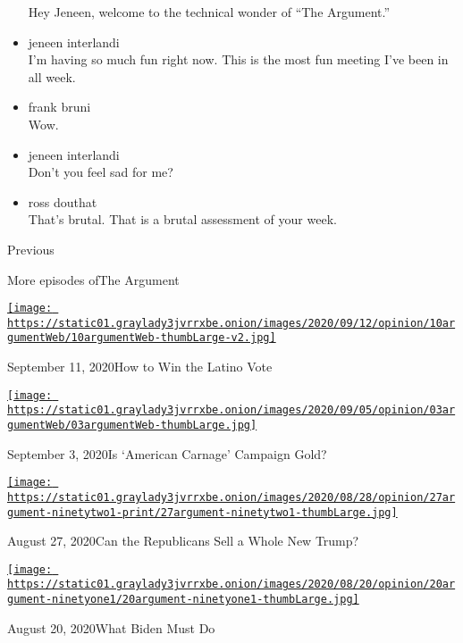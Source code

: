 \begin{itemize}
  Hey Jeneen, welcome to the technical wonder of ``The Argument.''
\item
  jeneen interlandi\\
  I'm having so much fun right now. This is the most fun meeting I've
  been in all week.
\item
  frank bruni\\
  Wow.
\item
  jeneen interlandi\\
  Don't you feel sad for me?
\item
  ross douthat\\
  That's brutal. That is a brutal assessment of your week.
\end{itemize}

Previous

More episodes ofThe Argument

\href{https://www.nytimes3xbfgragh.onion/2020/09/11/opinion/the-argument-latino-2020-vote.html?action=click\&module=audio-series-bar\&region=header\&pgtype=Article}{\texttt{[image: https://static01.graylady3jvrrxbe.onion/images/2020/09/12/opinion/10argumentWeb/10argumentWeb-thumbLarge-v2.jpg]}}

September 11, 2020How to Win the Latino Vote

\href{https://www.nytimes3xbfgragh.onion/2020/09/03/opinion/the-argument-trump-biden-kenosha-portland.html?action=click\&module=audio-series-bar\&region=header\&pgtype=Article}{\texttt{[image: https://static01.graylady3jvrrxbe.onion/images/2020/09/05/opinion/03argumentWeb/03argumentWeb-thumbLarge.jpg]}}

September 3, 2020Is `American Carnage' Campaign Gold?

\href{https://www.nytimes3xbfgragh.onion/2020/08/27/opinion/the-argument-republican-convention-trump.html?action=click\&module=audio-series-bar\&region=header\&pgtype=Article}{\texttt{[image: https://static01.graylady3jvrrxbe.onion/images/2020/08/28/opinion/27argument-ninetytwo1-print/27argument-ninetytwo1-thumbLarge.jpg]}}

August 27, 2020Can the Republicans Sell a Whole New Trump?

\href{https://www.nytimes3xbfgragh.onion/2020/08/20/opinion/the-argument-democratic-convention-biden.html?action=click\&module=audio-series-bar\&region=header\&pgtype=Article}{\texttt{[image: https://static01.graylady3jvrrxbe.onion/images/2020/08/20/opinion/20argument-ninetyone1/20argument-ninetyone1-thumbLarge.jpg]}}

August 20, 2020What Biden Must Do

